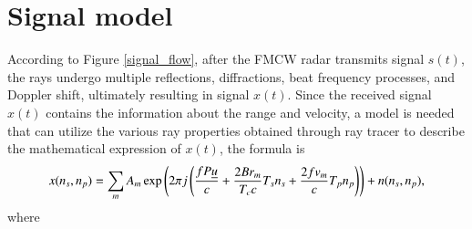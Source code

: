 \documentclass[12pt,DIV14,BCOR12mm,a4paper,footinclude=false,headinclude,parskip=half-,twoside,openright,cleardoublepage=empty,toc=index,bibliography=totoc,listof=totoc]{scrreprt}
\numberwithin{equation}{chapter}
\begin{document}
\section{Signal model} \label{Signal model}
According to Figure \ref{signal_flow}, after the FMCW radar transmits signal $s(t)$, the rays undergo multiple reflections, diffractions, beat frequency processes, and Doppler shift, ultimately resulting in signal $x(t)$. Since the received signal $x(t)$ contains the information about the range and velocity, a model \cite{ouza_simple_2017} is needed that can utilize the various ray properties obtained through ray tracer to describe the mathematical expression of $x(t)$, the formula is
\begin{equation}
    \centering
    x(n_s, n_p) = \sum_{m} A_m \exp \left( 2\pi j \left( \frac{f P \underline{u}}{c} + \frac{2 B r_{m}}{T_c c} T_s n_s + \frac{2 f v_{m}}{c} T_p n_p \right) \right) + n(n_s, n_p),
    \label{radar model formula}
\end{equation}
where
\end{document}
